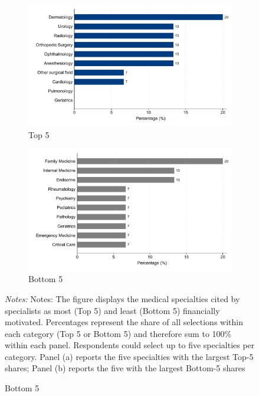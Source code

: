 \documentclass[11pt]{article}
\theoremstyle{definition}
\begin{document}
\begin{figure}[H]
    \centering
    \caption{Among Specialists: Categorization of Medical Specialties by Financial Motivation }
 \begin{subfigure}{0.45\textwidth}
        \caption{Top 5}
    \begin{adjustbox}{width=1\linewidth}  
    \includegraphics[width=1\linewidth]{Pre-Survey/figures/fin_motive_top_share_SP.pdf}
\end{adjustbox}
    \end{subfigure}
            \begin{subfigure}{0.45\textwidth}
        \caption{Bottom 5}
    \begin{adjustbox}{width=1\linewidth}  
    \includegraphics[width=1\linewidth]{Pre-Survey/figures/fin_motive_bottom_share_SP.pdf}
\end{adjustbox}
    \end{subfigure}
    \label{fig:top_bottom_sp}
     {\parbox{\linewidth}{           %
		\scriptsize{{{ \textit{Notes:} Notes: The figure displays the medical specialties cited by specialists as most (Top 5) and least (Bottom 5) financially motivated. Percentages represent the share of all selections within each category (Top 5 or Bottom 5) and therefore sum to 100\% within each panel. Respondents could select up to five specialties per category. Panel (a) reports the five specialties with the largest Top-5 shares; Panel (b) reports the five with the largest Bottom-5 shares}}}}}
\end{figure}
\end{document}
